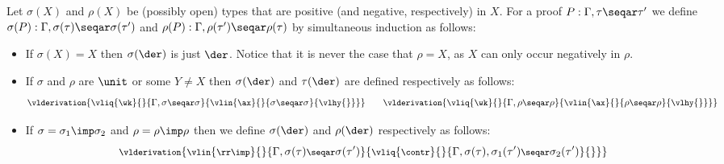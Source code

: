 \begin{definition}
    [Functors]
    \label{def:functors-in-muLJ}
 Let $\sigma(X) $ and $\rho(X)$ be (possibly open) types that are positive (and negative, respectively) in $X$. 
    For a proof $P:\Gamma, \tau \seqar \tau'$ we define $\sigma(P): \Gamma, \sigma(\tau)\seqar \sigma(\tau')$ and $\rho(P): \Gamma, \rho(\tau')\seqar \rho(\tau)$ by simultaneous induction as follows:
    \begin{itemize}
    \item If $\sigma(X)=X$ then $\sigma(\der)$ is just $\der$. Notice that it is never the  case that $\rho=X$, as $X$ can only occur negatively in $\rho$.
    \item If $\sigma$ and  $\rho$ are $\unit$ or some $Y\neq X$ then $\sigma(\der)$ and ${\tau}(\der)$ are defined respectively as follows: 
    \[
    \small
    \vlderivation{
    \vliq{\wk}{}{\Gamma, \sigma \seqar \sigma}{\vlin{\ax}{}{\sigma \seqar \sigma}{\vlhy{}}}
    }
    \qquad 
    \vlderivation{
    \vliq{\wk}{}{\Gamma, \rho \seqar \rho}{\vlin{\ax}{}{\rho \seqar \rho}{\vlhy{}}}
    }
    \]
    \item If $\sigma=\sigma_1 \imp \sigma_2$ and $\rho= \rho \imp \rho$ then we define $\sigma(\der)$ and $\rho(\der)$ respectively as follows:
    \[
    \footnotesize
    \vlderivation{
    \vlin{\rr \imp}{}{\Gamma, \sigma(\tau)\seqar \sigma(\tau')  }
     {
     \vliq{\contr}{}{\Gamma, \sigma(\tau) , \sigma_1(\tau')\seqar   \sigma_2(\tau')}{
}}}\]
\end{itemize}
\end{definition}
